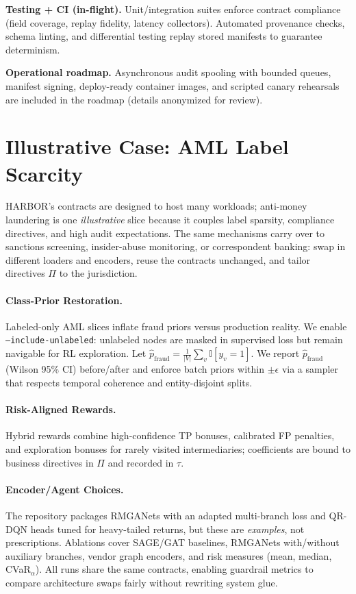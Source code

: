 \documentclass[letterpaper]{article}
\begin{document}
\textbf{Testing + CI (in-flight).}
Unit/integration suites enforce contract compliance (field coverage, replay fidelity, latency collectors). Automated provenance checks, schema linting, and differential testing replay stored manifests to guarantee determinism.

\textbf{Operational roadmap.}
Asynchronous audit spooling with bounded queues, manifest signing, deploy-ready container images, and scripted canary rehearsals are included in the roadmap (details anonymized for review).

\section{Illustrative Case: AML Label Scarcity}
\label{sec:aml}
\textsc{HARBOR}'s contracts are designed to host many workloads; anti-money laundering is one \emph{illustrative} slice because it couples label sparsity, compliance directives, and high audit expectations. The same mechanisms carry over to sanctions screening, insider-abuse monitoring, or correspondent banking: swap in different loaders and encoders, reuse the contracts unchanged, and tailor directives $\Pi$ to the jurisdiction.

\paragraph{Class-Prior Restoration.}
Labeled-only AML slices inflate fraud priors versus production reality. We enable \texttt{--include-unlabeled}: unlabeled nodes are masked in supervised loss but remain navigable for RL exploration. Let $\hat{p}_{\text{fraud}}=\frac{1}{|V|}\sum_v \mathbb{I}[y_v=1]$. We report $\hat{p}_{\text{fraud}}$ (Wilson 95\% CI) before/after and enforce batch priors within $\pm\epsilon$ via a sampler that respects temporal coherence and entity-disjoint splits.

\paragraph{Risk-Aligned Rewards.}
Hybrid rewards combine high-confidence TP bonuses, calibrated FP penalties, and exploration bonuses for rarely visited intermediaries; coefficients are bound to business directives in $\Pi$ and recorded in $\tau$.

\paragraph{Encoder/Agent Choices.}
The repository packages RMGANets with an adapted multi-branch loss and QR-DQN heads tuned for heavy-tailed returns, but these are \emph{examples}, not prescriptions. Ablations cover SAGE/GAT baselines, RMGANets with/without auxiliary branches, vendor graph encoders, and risk measures (mean, median, CVaR$_\alpha$). All runs share the same contracts, enabling guardrail metrics to compare architecture swaps fairly without rewriting system glue.
\end{document}
